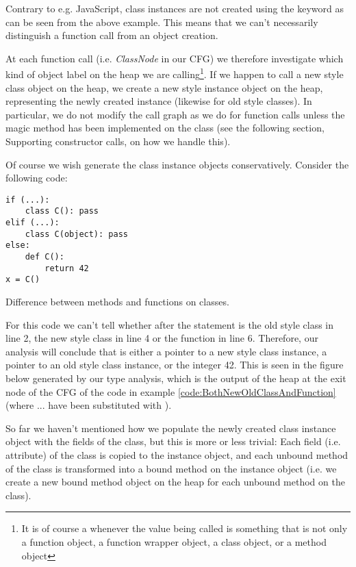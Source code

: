 Contrary to e.g. JavaScript, class instances are not created using the  keyword as can be seen from the above example. This means that we can't necessarily distinguish a function call from an object creation.

At each function call (i.e. \textit{ClassNode} in our CFG) we therefore investigate which kind of object label on the heap we are calling\footnote{It is of course a  whenever the value being called is something that is not only a function object, a function wrapper object, a class object, or a method object}. If we happen to call a new style class object on the heap, we create a new style instance object on the heap, representing the newly created instance (likewise for old style classes). In particular, we do not modify the call graph as we do for function calls unless the magic method  has been implemented on the class (see the following section, Supporting constructor calls, on how we handle this).

Of course we wish generate the class instance objects conservatively. Consider the following code:

\begin{listing}[H]
	\begin{verbatim}
if (...):
	class C(): pass
elif (...):
	class C(object): pass
else:
	def C():
		return 42
x = C()
	\end{verbatim}
	\caption{Difference between methods and functions on classes.}\label{code:BothNewOldClassAndFunction}
\end{listing}

For this code we can't tell whether  after the  statement is the old style class in line 2, the new style class in line 4 or the function in line 6. Therefore, our analysis will conclude that  is either a pointer to a new style class instance, a pointer to an old style class instance, or the integer 42. This is seen in the figure below generated by our type analysis, which is the output of the heap at the exit node of the CFG of the code in example \ref{code:BothNewOldClassAndFunction} (where ... have been substituted with ).


So far we haven't mentioned how we populate the newly created class instance object with the fields of the class, but this is more or less trivial: Each field (i.e. attribute) of the class is copied to the instance object, and each unbound method of the class is transformed into a bound method on the instance object (i.e. we create a new bound method object on the heap for each unbound method on the class).


